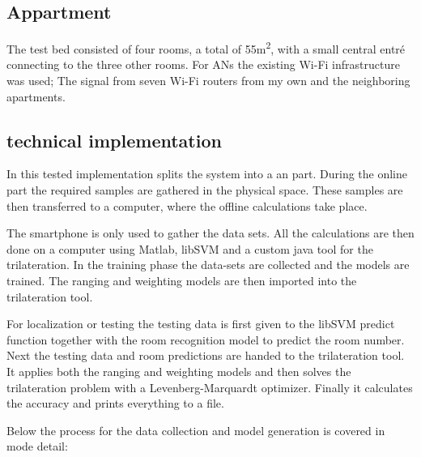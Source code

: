 \subsection{Appartment}
The test bed consisted of four rooms, a total of 55m\textsuperscript{2}, with a small central entré connecting to the three other rooms. For ANs the existing Wi-Fi infrastructure was used; The signal from seven Wi-Fi routers from my own and the neighboring apartments. 

\subsection{technical implementation}
In this tested implementation splits the system into a  an  part. During the online part the required samples are gathered in the physical space. These samples are then transferred to a computer, where the offline calculations take place.

The smartphone is only used to gather the data sets. All the calculations are then done on a computer using Matlab, libSVM and a custom java tool for the trilateration. In the training phase the data-sets are collected and the models are trained. The ranging and weighting models are then imported into the trilateration tool.

For localization or testing the testing data is first given to the libSVM predict function together with the room recognition model to predict the room number. Next the testing data and room predictions are handed to the trilateration tool. It applies both the ranging and weighting models and then solves the trilateration problem with a Levenberg-Marquardt optimizer. Finally it calculates the accuracy and prints everything to a file.

Below the process for the data collection and model generation is covered in mode detail:

